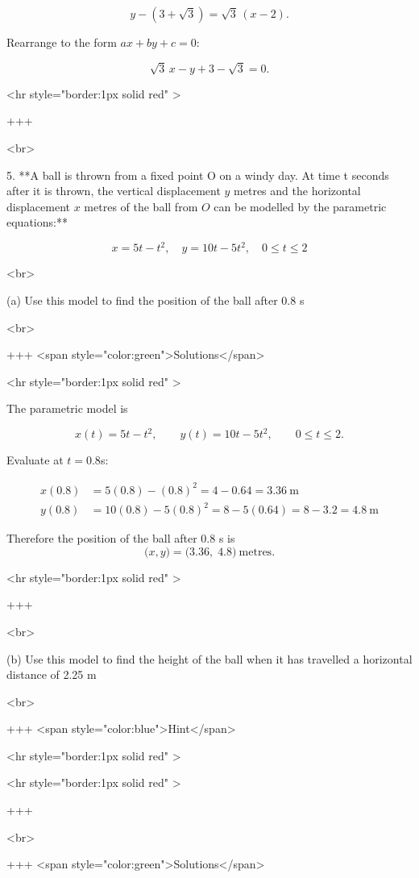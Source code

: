 $$
y-(3+\sqrt{3})=\sqrt{3}\,(x-2).
$$

Rearrange to the form $ax+by+c=0$:

$$
\sqrt{3}\,x - y + 3 - \sqrt{3} = 0.
$$

<hr style="border:1px solid red" >

+++

<br>


5. **A ball is thrown from a fixed point O on a windy day. At time t seconds after it is thrown, the vertical displacement $y$ metres and the horizontal displacement $x$ metres of the ball from $O$ can be modelled by the parametric equations:**

$$
x=5 t-t^{2}, \quad y=10 t-5 t^{2}, \quad 0 \leq t \leq 2
$$

<br>

(a) Use this model to find the position of the ball after 0.8 s

<br>

+++ <span style="color:green">Solutions</span>

<hr style="border:1px solid red" >

The parametric model is

$$
x(t)=5t-t^{2},\qquad y(t)=10t-5t^{2},\qquad 0\le t\le 2.
$$

Evaluate at $t=0.8$s:

$$
\begin{align*}
x(0.8) &= 5(0.8) - (0.8)^2 = 4 - 0.64 = 3.36\ \text{m}\\
y(0.8) &= 10(0.8) - 5(0.8)^2 = 8 - 5(0.64) = 8 - 3.2 = 4.8\ \text{m}
\end{align*}
$$

Therefore the position of the ball after $0.8$ s is
$$
\bigl(x,y\bigr) = \bigl(3.36,\;4.8\bigr)\ \text{metres}.
$$

<hr style="border:1px solid red" >

+++

<br>

(b) Use this model to find the height of the ball when it has travelled a horizontal distance of 2.25 m

<br>

+++ <span style="color:blue">Hint</span>

<hr style="border:1px solid red" >

<hr style="border:1px solid red" >

+++

<br>

+++ <span style="color:green">Solutions</span>

